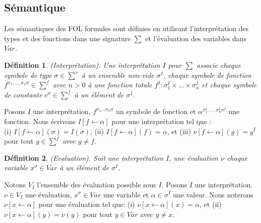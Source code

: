\documentclass[9pt]{book}
\newtheorem{definition}{D\'efinition}[section]
\begin{document}
	\subsection{S\'emantique}
	Les s\'emantiques des FOL formules sont d\'efinies en utilisant l'interpr\'etation des types et des fonctions dans une signature $\sum$ et l'\'evaluation des variables dans $Var$.
\begin{definition}
(Interpr\'etation). Une interpr\'etation $I$ pour $\sum$ associe chaque symbole de type $\sigma \in \sum^{s}$ \`a un ensemble non-vide $\sigma^{I}$, chaque symbole de fonction $f^{\sigma_{1},...,\sigma_{n}\sigma} \in \sum^{f}$ avec $n > 0$ \`a une fonction totale $f^{I} : \sigma_{1}^{I}\times ... \times \sigma_{n}^{I}$ et chaque symbole de constante $c^{\sigma} \in \sum^{f}$ \`a un \'el\'ement de $\sigma^{I}$.
\end{definition}
	Posons $I$ une interpr\'etation, $f^{\sigma_{1} ...\sigma_{n} \sigma}$ un symbole de fonction et $\alpha^{\sigma_{1}^{I},...,\sigma_{n}^{I}\sigma^{I}}$ une fonction. Nous \'ecrivons $I[f \leftarrow \alpha]$ pour une interpr\'etation tel que : \\(i) $I[f\leftarrow\alpha](\sigma) = I(\sigma)$, (ii) $I[f\leftarrow\alpha](f) = \alpha$, et (iii) $\nu[f\leftarrow\alpha](g) = g^{I}$ pour tout $g \in \sum^{f}$ avec $g\neq f$.
	
\begin{definition}
(Evaluation). Soit une interpr\'etation $I$, une \'evaluation $\nu$ chaque variable $x^{\sigma} \in Var$ \`a un \'el\'ement de $\sigma^{I}$.
\end{definition}
Notons $V_{I}$ l'ensemble des \'evaluation possible sous $I$.
Posons $I$ une interpr\'etation, $\nu \in V_{I}$ une \'evaluation, $x^{\sigma} \in Var$ une variable et $\alpha \in \sigma^{I}$ une valeur. Nous noterons $\nu[x\leftarrow\alpha]$ pour une \'evaluation tel que: (i) $\nu[x\leftarrow\alpha](x) = \alpha$, et (ii) $\nu[x\leftarrow\alpha](y)=\nu(y)$ pour tout $y\in Var$ avec $y\neq x$.
\end{document}
